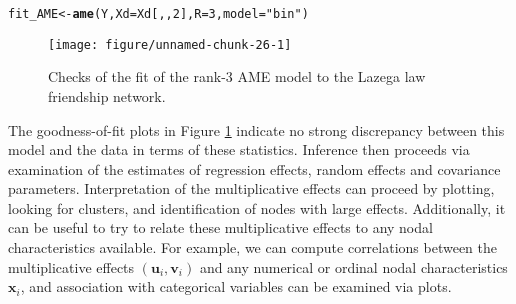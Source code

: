 \documentclass[11pt]{article}\usepackage[]{graphicx}\usepackage[]{color}
\makeatletter
\def\maxwidth{ %
  \ifdim\Gin@nat@width>\linewidth
    \linewidth
  \else
    \Gin@nat@width
  \fi
}
\newcommand{\hlnum}[1]{\textcolor[rgb]{0.686,0.059,0.569}{#1}}%
\newcommand{\hlstr}[1]{\textcolor[rgb]{0.192,0.494,0.8}{#1}}%
\newcommand{\hlstd}[1]{\textcolor[rgb]{0.345,0.345,0.345}{#1}}%
\newcommand{\hlkwb}[1]{\textcolor[rgb]{0.69,0.353,0.396}{#1}}%
\newcommand{\hlkwc}[1]{\textcolor[rgb]{0.333,0.667,0.333}{#1}}%
\newcommand{\hlkwd}[1]{\textcolor[rgb]{0.737,0.353,0.396}{\textbf{#1}}}%
\newenvironment{kframe}{%
 \def\at@end@of@kframe{}%
 \ifinner\ifhmode%
  \def\at@end@of@kframe{\end{minipage}}%
  \begin{minipage}{\columnwidth}%
 \fi\fi%
 \def\FrameCommand##1{\hskip\@totalleftmargin \hskip-\fboxsep
 \colorbox{shadecolor}{##1}\hskip-\fboxsep
     \hskip-\linewidth \hskip-\@totalleftmargin \hskip\columnwidth}%
 \MakeFramed {\advance\hsize-\width
   \@totalleftmargin\z@ \linewidth\hsize
   \@setminipage}}%
 {\par\unskip\endMakeFramed%
 \at@end@of@kframe}
\newenvironment{knitrout}{}{} %
\newcommand{\bl}[1]{{\mathbf #1}}
\makeatother
\begin{document}
\begin{knitrout}\footnotesize
{}\color{fgcolor}\begin{kframe}
\begin{alltt}
\hlstd{fit_AME}\hlkwb{<-}\hlkwd{ame}\hlstd{(Y,} \hlkwc{Xd}\hlstd{=Xd[,,}\hlnum{2}\hlstd{],} \hlkwc{R}\hlstd{=}\hlnum{3}\hlstd{,} \hlkwc{model}\hlstd{=}\hlstr{"bin"}\hlstd{)}
\end{alltt}
\end{kframe}
\end{knitrout}


\begin{figure}
\begin{knitrout}\footnotesize
{}\color{fgcolor}

{\centering \texttt{[image: figure/unnamed-chunk-26-1]} 

}



\end{knitrout}
\caption{ Checks of the fit of the rank-3 AME model to the 
Lazega law friendship network.}
\label{fig:ll_fame3}
\end{figure}


The goodness-of-fit plots in Figure \ref{fig:ll_fame3}
indicate no strong discrepancy between this model and 
the data in terms of these statistics. 
Inference then proceeds via 
examination of the estimates of regression effects, 
random effects and covariance parameters. 
Interpretation of the multiplicative effects 
can proceed by plotting, looking for clusters, and 
identification of nodes with large effects. 
Additionally, it can be useful to try to relate these
multiplicative effects to any nodal characteristics available. 
For example, we can compute correlations between the
multiplicative effects $(\bl u_i,\bl v_i)$ and any 
numerical or ordinal nodal characteristics $\bl x_i$, and 
association with categorical variables can be examined via plots. 
\end{document}
